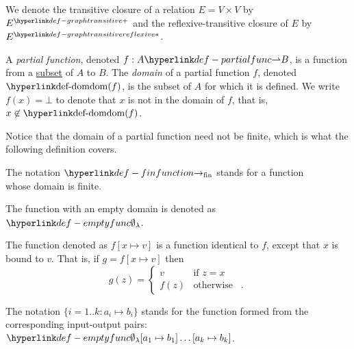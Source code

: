 \hypertarget{def-graphtransitive}{}
\hypertarget{def-graphtransitivereflexive}{}
\begin{definition}
We denote the transitive closure of a relation $E = V \times V$ by $\graphtransitive{E}$
and the reflexive-transitive closure of $E$ by $\graphtransitivereflexive{E}$.
\end{definition}

\hypertarget{def-partialfunc}{}
\hypertarget{def-dom}{}
\begin{definition}
  A \emph{partial function}, denoted $f : A \partialto B$, is a function from a \underline{subset} of $A$ to $B$.
  The \emph{domain} of a partial function $f$, denoted $\dom(f)$, is the subset of $A$ for which it is defined.
  We write $f(x) = \bot$ to denote that $x$ is not in the domain of $f$, that is, $x \not\in \dom(f)$.
\end{definition}

Notice that the domain of a partial function need not be finite, which is what the following definition covers.

\hypertarget{def-finfunction}{}
\begin{definition}
The notation $\rightarrowfin$ stands for a function \\ whose domain is finite.
\end{definition}

\hypertarget{def-emptyfunc}{}
\begin{definition}
The function with an empty domain is denoted as $\emptyfunc$.
\end{definition}

\begin{definition}
  The function denoted as $f[x \mapsto v]$ is a function identical to $f$, except that $x$ is bound
  to $v$. That is, if  $g = f[x \mapsto v]$ then
  \[
    g(z) =
  \begin{cases}
    v     & \text{if } z = x\\
    f(z)  & \text{otherwise } \enspace.
  \end{cases}
  \]

  The notation $\{i=1..k: a_i\mapsto b_i\}$ stands for the function formed from the corresponding input-output pairs:
  $\emptyfunc[a_1\mapsto b_1]\ldots[a_k\mapsto b_k]$.
\end{definition}

